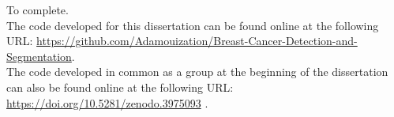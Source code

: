 To complete.\\

The code developed for this dissertation can be found online at the following URL: \url{https://github.com/Adamouization/Breast-Cancer-Detection-and-Segmentation}.\\

The code developed in common as a group at the beginning of the dissertation can also be found online at the following URL: \url{https://doi.org/10.5281/zenodo.3975093} \citep{adam_jaamour_2020_3975093}.